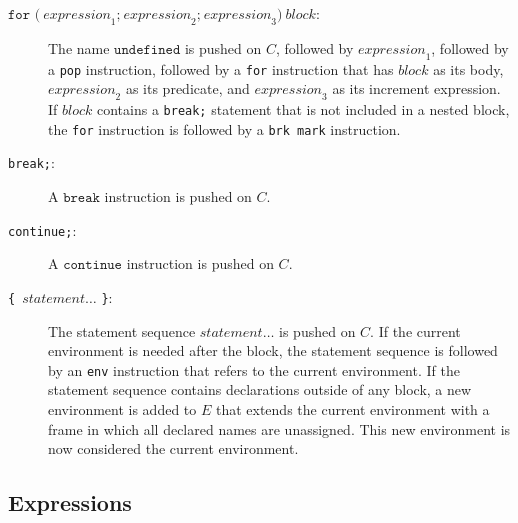\begin{description}
\item[$\texttt{for (}\ \textit{expression}_1\texttt{;}\ \textit{expression}_2\texttt{;}\ \textit{expression}_3\texttt{)}\ \textit{block}$:]
The name $\texttt{undefined}$ is pushed on $C$,
followed by $\textit{expression}_1$, 
followed by a \texttt{pop} instruction,
followed by a \texttt{for} instruction
that has
$\textit{block}$ as its body,
$\textit{expression}_2$ as its predicate,
and $\textit{expression}_3$ as its increment expression.
If $\textit{block}$ contains a \lstinline{break;}
statement that is not included in a nested block, the \texttt{for} instruction
is followed by a \texttt{brk mark} instruction.

\item[\texttt{break;}:]
A $\texttt{break}$ instruction is pushed on $C$.

\item[\texttt{continue;}:]
A $\texttt{continue}$ instruction is pushed on $C$.

\item[\texttt{\{}\ $\textit{statement}\ldots$ \texttt{\}}:]
The statement sequence $\textit{statement}\ldots$ is pushed on $C$.
If the current environment is needed after the block, the
statement sequence is followed by an \texttt{env} instruction that
refers to the current environment.
If the statement sequence contains declarations outside of
any block, a new environment is added to $E$ that extends the current environment
with a frame in which all declared names are unassigned. This new environment
is now considered the current environment.

\end{description}

\subsection*{Expressions}


